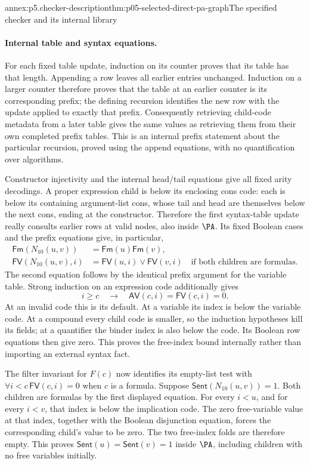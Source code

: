 \begin{annexitem}{annex:p5.checker-description}{thm:p05-selected-direct-pa-graph}{The specified checker and its internal library}
\paragraph{Internal table and syntax equations.}
For each fixed table update, induction on its counter proves that its table
has that length.  Appending a row leaves all earlier entries unchanged.
Induction on a larger counter therefore proves that the table at an earlier
counter is its corresponding prefix; the defining recursion identifies the
new row with the update applied to exactly that prefix.  Consequently
retrieving child-code metadata from a later table gives the same values as
retrieving them from their own completed prefix tables.  This is an internal
prefix statement about the particular recursion, proved using the append
equations, with no quantification over algorithms.

Constructor injectivity and the internal head/tail equations give all fixed
arity decodings.  A proper expression child is below its enclosing cons
code: each is below its containing argument-list cons, whose tail and head
are themselves below the next cons, ending at the constructor.  Therefore
the first syntax-table update really consults earlier rows at valid nodes,
also inside \(\PA\).  Its fixed Boolean cases and the prefix equations give,
in particular,
\[
\begin{aligned}
 \mathsf{Fm}(N_{10}(u,v))&=\mathsf{Fm}(u)\mathsf{Fm}(v),\\
 \mathsf{FV}(N_{10}(u,v),i)&=
        \mathsf{FV}(u,i)\lor\mathsf{FV}(v,i)
            \quad\text{if both children are formulas}.
\end{aligned}
\]
The second equation follows by the identical prefix argument for the
variable table.  Strong induction on an expression code additionally gives
\[
 i\geq c\quad\longrightarrow\quad
             \mathsf{AV}(c,i)=\mathsf{FV}(c,i)=0.
\]
At an invalid code this is its default.  At a variable its index is below
the variable code.  At a compound every child code is smaller, so the
induction hypotheses kill its fields; at a quantifier the binder index is
also below the code.  Its Boolean row equations then give zero.  This proves
the free-index bound internally rather than importing an external syntax fact.

The filter invariant for \(F(c)\) now identifies its empty-list test with
\(\forall i<c\,\mathsf{FV}(c,i)=0\) when \(c\) is a formula.
Suppose \(\mathsf{Sent}(N_{10}(u,v))=1\).  Both children are formulas
by the first displayed equation.  For every \(i<u\), and for every
\(i<v\), that index is below the implication code.  The zero free-variable
value at that index, together with the Boolean disjunction equation, forces
the corresponding child's value to be zero.  The two free-index folds are
therefore empty.  This proves \(\mathsf{Sent}(u)=\mathsf{Sent}(v)=1\)
inside \(\PA\), including children with no free variables initially.


\end{annexitem}
